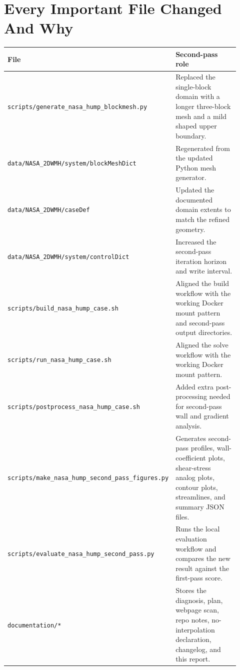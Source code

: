 \documentclass[11pt]{article}
\begin{document}
\section{Every Important File Changed And Why}
\begin{table}[H]
\centering
\begin{tabular}{p{0.31\linewidth} p{0.61\linewidth}}
\toprule
File & Second-pass role \\
\midrule
\texttt{scripts/generate\_nasa\_hump\_blockmesh.py} & Replaced the single-block domain with a longer three-block mesh and a mild shaped upper boundary. \\
\texttt{data/NASA\_2DWMH/system/blockMeshDict} & Regenerated from the updated Python mesh generator. \\
\texttt{data/NASA\_2DWMH/caseDef} & Updated the documented domain extents to match the refined geometry. \\
\texttt{data/NASA\_2DWMH/system/controlDict} & Increased the second-pass iteration horizon and write interval. \\
\texttt{scripts/build\_nasa\_hump\_case.sh} & Aligned the build workflow with the working Docker mount pattern and second-pass output directories. \\
\texttt{scripts/run\_nasa\_hump\_case.sh} & Aligned the solve workflow with the working Docker mount pattern. \\
\texttt{scripts/postprocess\_nasa\_hump\_case.sh} & Added extra post-processing needed for second-pass wall and gradient analysis. \\
\texttt{scripts/make\_nasa\_hump\_second\_pass\_figures.py} & Generates second-pass profiles, wall-coefficient plots, shear-stress analog plots, contour plots, streamlines, and summary JSON files. \\
\texttt{scripts/evaluate\_nasa\_hump\_second\_pass.py} & Runs the local evaluation workflow and compares the new result against the first-pass score. \\
\texttt{documentation/*} & Stores the diagnosis, plan, webpage scan, repo notes, no-interpolation declaration, changelog, and this report. \\
\bottomrule
\end{tabular}
\end{table}
\end{document}
